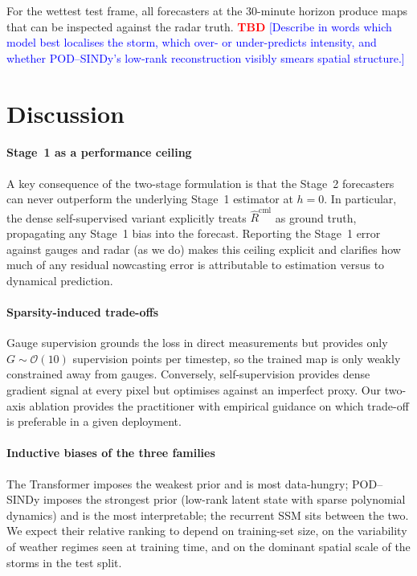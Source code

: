 \documentclass[conference]{IEEEtran}
\newcommand{\tbd}{\textcolor{red}{\textbf{TBD}}}
\newcommand{\note}[1]{\textcolor{blue}{[#1]}}
\begin{document}
For the wettest test frame, all forecasters at the 30-minute horizon
produce maps that can be inspected against the radar truth.
\tbd{} \note{Describe in words which model best localises the storm,
which over- or under-predicts intensity, and whether POD--SINDy's
low-rank reconstruction visibly smears spatial structure.}

\section{Discussion}
\label{sec:discussion}

\paragraph*{Stage~1 as a performance ceiling}
A key consequence of the two-stage formulation is that the Stage~2
forecasters can never outperform the underlying Stage~1 estimator at
$h\!=\!0$. In particular, the dense self-supervised variant explicitly
treats $\widehat{R}^{\mathrm{cml}}$ as ground truth, propagating any
Stage~1 bias into the forecast. Reporting the Stage~1 error against
gauges and radar (as we do) makes this ceiling explicit and clarifies
how much of any residual nowcasting error is attributable to estimation
versus to dynamical prediction.

\paragraph*{Sparsity-induced trade-offs}
Gauge supervision grounds the loss in direct measurements but provides
only $G\!\sim\!\mathcal{O}(10)$ supervision points per timestep, so the
trained map is only weakly constrained away from gauges. Conversely,
self-supervision provides dense gradient signal at every pixel but
optimises against an imperfect proxy. Our two-axis ablation provides
the practitioner with empirical guidance on which trade-off is
preferable in a given deployment.

\paragraph*{Inductive biases of the three families}
The Transformer imposes the weakest prior and is most data-hungry;
POD--SINDy imposes the strongest prior (low-rank latent state with
sparse polynomial dynamics) and is the most interpretable; the recurrent
SSM sits between the two. We expect their relative ranking to depend on
training-set size, on the variability of weather regimes seen at
training time, and on the dominant spatial scale of the storms in the
test split.
\end{document}
